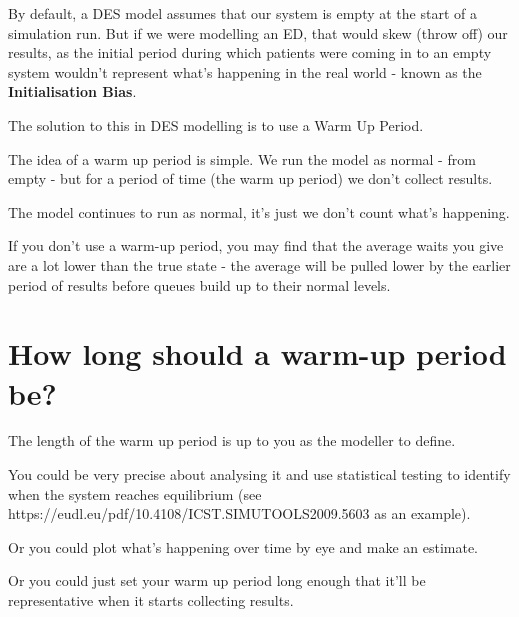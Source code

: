 \documentclass[
  letterpaper,
  DIV=11,
  numbers=noendperiod]{scrreprt}
\begin{document}
By default, a DES model assumes that our system is empty at the start of
a simulation run. But if we were modelling an ED, that would skew (throw
off) our results, as the initial period during which patients were
coming in to an empty system wouldn't represent what's happening in the
real world - known as the \textbf{Initialisation Bias}.

The solution to this in DES modelling is to use a Warm Up Period.

The idea of a warm up period is simple. We run the model as normal -
from empty - but for a period of time (the warm up period) we don't
collect results.

The model continues to run as normal, it's just we don't count what's
happening.

\begin{tcolorbox}[enhanced jigsaw, rightrule=.15mm, colback=white, colframe=quarto-callout-warning-color-frame, colbacktitle=quarto-callout-warning-color!10!white, toprule=.15mm, coltitle=black, opacityback=0, titlerule=0mm, bottomtitle=1mm, breakable, title=\textcolor{quarto-callout-warning-color}{\faExclamationTriangle}\hspace{0.5em}{Warning}, opacitybacktitle=0.6, toptitle=1mm, arc=.35mm, bottomrule=.15mm, leftrule=.75mm, left=2mm]

If you don't use a warm-up period, you may find that the average waits
you give are a lot lower than the true state - the average will be
pulled lower by the earlier period of results before queues build up to
their normal levels.

\end{tcolorbox}

\section{How long should a warm-up period
be?}\label{how-long-should-a-warm-up-period-be}

The length of the warm up period is up to you as the modeller to define.

You could be very precise about analysing it and use statistical testing
to identify when the system reaches equilibrium (see
https://eudl.eu/pdf/10.4108/ICST.SIMUTOOLS2009.5603 as an example).

Or you could plot what's happening over time by eye and make an
estimate.

Or you could just set your warm up period long enough that it'll be
representative when it starts collecting results.
\end{document}
